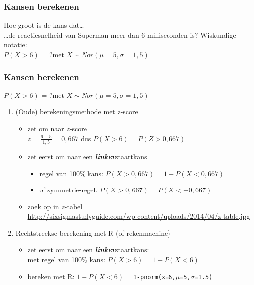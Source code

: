 \documentclass{beamer}
\begin{document}
\begin{frame}
\frametitle{Kansen berekenen}
Hoe groot is de kans dat\dots\\
\dots de reactiesnelheid van Superman meer dan 6 milliseconden is?
\vfill
Wiskundige notatie:\\
\hspace{1cm}$P( X > 6)$ = ?\hspace{1cm}met $X \sim Nor(\mu=5,\sigma=1,5)$
\vfill
{}
\end{frame}

\begin{frame}
\frametitle{Kansen berekenen}
$P( X > 6)$ = ?\hspace{1cm}met $X \sim Nor(\mu=5,\sigma=1,5)$
\vfill
\begin{enumerate}
  \item (Oude) berekeningsmethode met z-score
  \begin{itemize}
    \pause
    \item zet om naar $z$-score\\
    $z=\frac{6-5}{1,5}=0,667$ dus $P(X>6) = P(Z>0,667)$
    \item zet eerst om naar een \textbf{\textit{linker}}staartkans
    \begin{itemize}
       \item regel van 100\% kans: $P(X>0,667)=1-P(X<0,667)$
       \item of symmetrie-regel: $P(X>0,667)=P(X<-0,667)$
    \end{itemize}
    \item zoek op in $z$-tabel\\
    \url{http://sixsigmastudyguide.com/wp-content/uploads/2014/04/z-table.jpg}
  \end{itemize}
\vfill
  \item Rechtstreekse berekening met R (of rekenmachine)
  \begin{itemize}
  \pause
  \item zet eerst om naar een \textbf{\textit{linker}}staartkans:\\
  met regel van 100\% kans: $P(X>6)=1-P(X<6)$
  \item bereken met R: $1-P(X<6)=$\texttt{1-pnorm(x=6,$\mu$=5,$\sigma$=1.5)}
\end{itemize}
\end{enumerate}
\end{frame}
\end{document}
